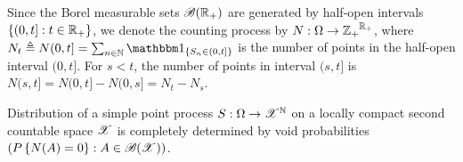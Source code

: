 \documentclass[letterpaper,10pt,english]{article}
\begin{document}
\begin{shaded} 
\begin{exmp} 
Since the Borel measurable sets $\mathscr{B}(\mathbb{R}_+)$ are generated by half-open intervals $\left\{(0,t]: t \in \mathbb{R}_+\right\}$, 
we denote the counting process by $N: \Omega \to {\mathbb{Z}_+}^{\mathbb{R}_+}$, 
where $N_t \triangleq N(0, t]= \sum_{n \in \N}\SetIn{S_n \in (0,t]}$ is the number of points in the half-open interval $(0,t]$. 
For $s < t$, the number of points in interval $(s,t]$ is $N(s,t] = N(0,t] - N(0,s] = N_t - N_s$. 
\end{exmp}
\end{shaded}
\begin{thm}[R\'{e}nyi] 
\label{thm:void}
Distribution of a simple point process $S:\Omega\to\mathscr{X}^{\mathbb{N}}$ on a locally compact second countable space $\mathscr{X}$ is completely determined by void probabilities $(P\left\{N(A)=0\right\}: A \in \mathscr{B}(\mathscr{X}))$. 
\end{thm}
\end{document}
